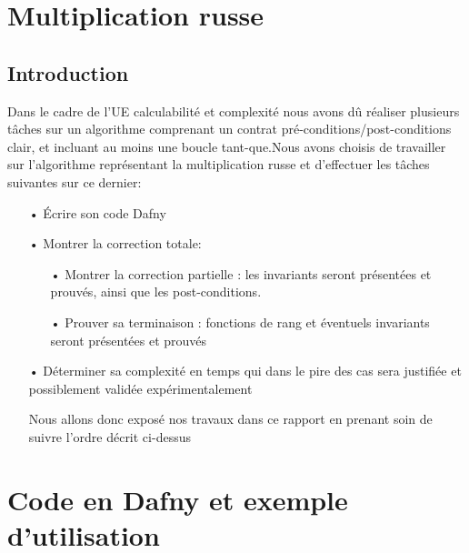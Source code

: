 \documentclass[12pt,a4paper]{report}
\begin{document}
\section*{Multiplication russe}

\subsection*{Introduction}

\begin{large}
\begin{flushleft}
Dans le cadre de l'UE calculabilité et complexité nous avons dû réaliser plusieurs tâches sur un algorithme comprenant un contrat pré-conditions/post-conditions clair, et incluant au moins une boucle tant-que.Nous avons choisis de travailler sur l'algorithme représentant la multiplication russe et d'effectuer les tâches suivantes sur ce dernier: 

\begin{itemize}
\item[•] Écrire son code Dafny
\medskip

\item[•] Montrer la correction totale:
\begin{itemize}
\item[•] Montrer la  correction partielle : les invariants seront présentées et prouvés, ainsi que les post-conditions.
\medskip

\item[•] Prouver sa terminaison : fonctions de rang et éventuels invariants seront présentées et prouvés
\medskip 
\end{itemize}

\item[•] Déterminer sa complexité en temps qui dans le pire des cas sera justifiée et possiblement validée expérimentalement

\medskip

Nous allons donc exposé nos travaux dans ce rapport en prenant soin de suivre l'ordre décrit ci-dessus
\end{itemize}
\end{flushleft}
\end{large}

\section*{Code en Dafny et exemple d'utilisation}
\end{document}
